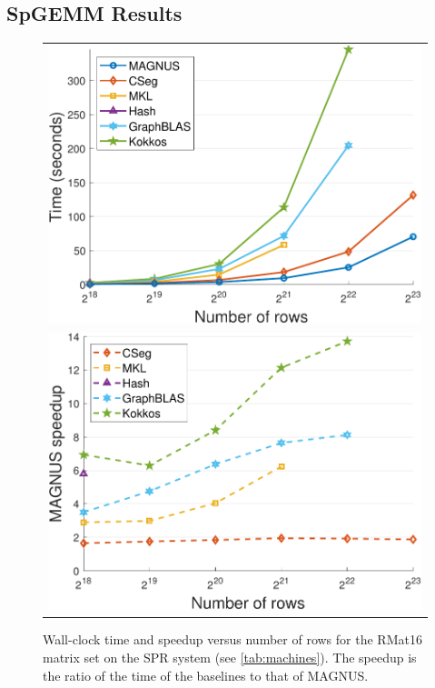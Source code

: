 \subsection{SpGEMM Results}\label{sec:results_spgemm}

\begin{figure}[htbp]
\newcommand{\figwidthLoc}{.95\linewidth}
\centering
\begin{tabular}{c}
\includegraphics[width=\figwidth]{figs/baselines_spr_rmat16_time.pdf} \\
\includegraphics[width=\figwidth]{figs/baselines_spr_rmat16_speedup.pdf}
\end{tabular}
\caption{Wall-clock time and speedup versus number of rows for the RMat16 matrix set on the SPR system (see \autoref{tab:machines}).
The speedup is the ratio of the time of the baselines to that of MAGNUS.}
\label{fig:baselines_rmat16}
\end{figure}

